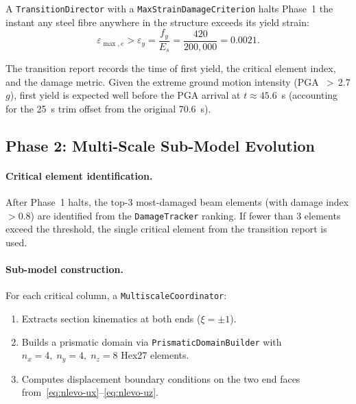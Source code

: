 A \texttt{TransitionDirector} with a
\texttt{MaxStrainDamageCriterion} halts Phase~1 the instant any steel
fibre anywhere in the structure exceeds its yield strain:
\begin{equation}
  \varepsilon_{\max,e} > \varepsilon_y
  = \frac{f_y}{E_s}
  = \frac{420}{200{,}000}
  = 0.0021.
  \label{eq:nlevo-yield-criterion}
\end{equation}

The transition report records the time of first yield, the critical
element index, and the damage metric.  Given the extreme ground
motion intensity (PGA~$>\,$2.7$g$), first yield is expected well
before the PGA arrival at $t \approx 45.6$~s (accounting for the
25~s trim offset from the original 70.6~s).


\subsection{Phase 2: Multi-Scale Sub-Model Evolution}
\label{ssec:nlevo-phase2}

\paragraph{Critical element identification.}
After Phase~1 halts, the top-3 most-damaged beam elements
(with damage index $> 0.8$) are identified from the
\texttt{DamageTracker} ranking.  If fewer than 3 elements exceed
the threshold, the single critical element from the transition
report is used.

\paragraph{Sub-model construction.}
For each critical column, a \texttt{MultiscaleCoordinator}:
\begin{enumerate}
  \item Extracts section kinematics at both ends ($\xi = \pm 1$).
  \item Builds a prismatic domain via \texttt{PrismaticDomainBuilder}
        with $n_x = 4,\; n_y = 4,\; n_z = 8$ Hex27 elements.
  \item Computes displacement boundary conditions on the two end faces
        from~\eqref{eq:nlevo-ux}--\eqref{eq:nlevo-uz}.
\end{enumerate}

